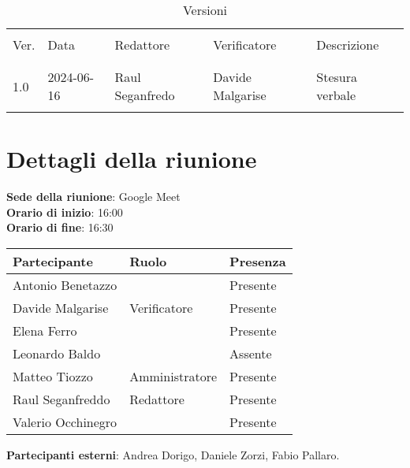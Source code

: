 \documentclass[italian,12pt]{article}
\begin{document}


\newpage



\begin{table}[!h]
	\caption{Versioni}
	\footnotesize
	\begin{center}
		\begin{tabular}{ l l l l p{6cm} }
			\hline                                                                           \\[-2ex]
			Ver. & Data       & Redattore       & Verificatore       & Descrizione           \\
			\\[-2ex] \hline \\[-1.5ex]
			1.0  & 2024-06-16 & Raul Seganfredo & Davide Malgarise & Stesura verbale \\
			\\[-1.5ex] \hline
		\end{tabular}
	\end{center}
\end{table}

\newpage

\tableofcontents

\newpage

\section{Dettagli della riunione}


\textbf{Sede della riunione}: Google Meet\\
\textbf{Orario di inizio}: 16:00\\
\textbf{Orario di fine}: 16:30\\

\begin{flushleft}
	\begin{table}[!h]
		\begin{tabular}{ |l|l|l| }
			\hline
			\textbf{Partecipante} & \textbf{Ruolo} & \textbf{Presenza} \\
			\hline
			Antonio Benetazzo     &                & Presente          \\
			Davide Malgarise      & Verificatore   & Presente          \\
			Elena Ferro           & 			   & Presente          \\
			Leonardo Baldo        & 			   & Assente           \\
			Matteo Tiozzo         & Amministratore & Presente          \\
			Raul Seganfreddo      & Redattore	   & Presente          \\
			Valerio Occhinegro    &                & Presente          \\
			\hline
		\end{tabular}
	\end{table}
	\textbf{Partecipanti esterni}: Andrea Dorigo, Daniele Zorzi, Fabio Pallaro.\\
\end{flushleft}
\end{document}
